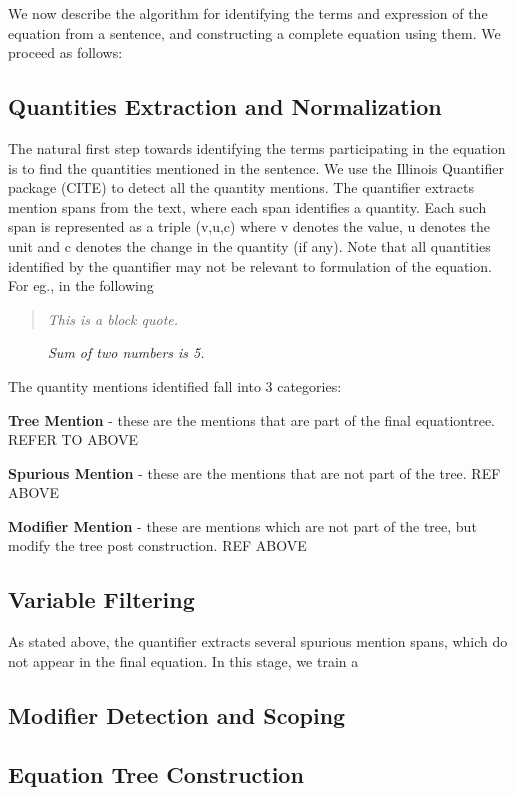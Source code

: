 We now describe the algorithm for identifying the terms and expression of the equation from a sentence, and constructing a complete equation using them. We proceed as follows:
\subsection{Quantities Extraction and Normalization}
The natural first step towards identifying the terms participating in the equation is to find the quantities mentioned in the sentence. We use the Illinois Quantifier package (CITE) to detect all the quantity mentions.
The quantifier extracts mention spans from the text, where each span identifies a quantity. Each such span is represented as a triple (v,u,c) where v denotes the value, u denotes the unit and c denotes the change in the quantity (if any).
Note that all quantities identified by the quantifier may not be relevant to formulation of the equation. For eg., in the following

\begin{quote}
  \emph{This is a block quote.}
\end{quote}

\begin{figure}
  \centering
\emph{Sum of two numbers is 5.}
\end{figure}

The quantity mentions identified fall into 3 categories:
\begin{inparaenum}
\item {\bf Tree Mention} - these are the mentions that are part of the final equationtree. REFER TO ABOVE
\item {\bf Spurious Mention} - these are the mentions that are not part of the tree.
  REF ABOVE
\item {\bf Modifier Mention} - these are mentions which are not part of the tree, but modify the tree post construction. REF ABOVE
\end{inparaenum}

\subsection{Variable Filtering}
As stated above, the quantifier extracts several spurious mention spans, which do not appear in the final equation. In this stage, we train a

\subsection{Modifier Detection and Scoping}
\subsection{Equation Tree Construction}
